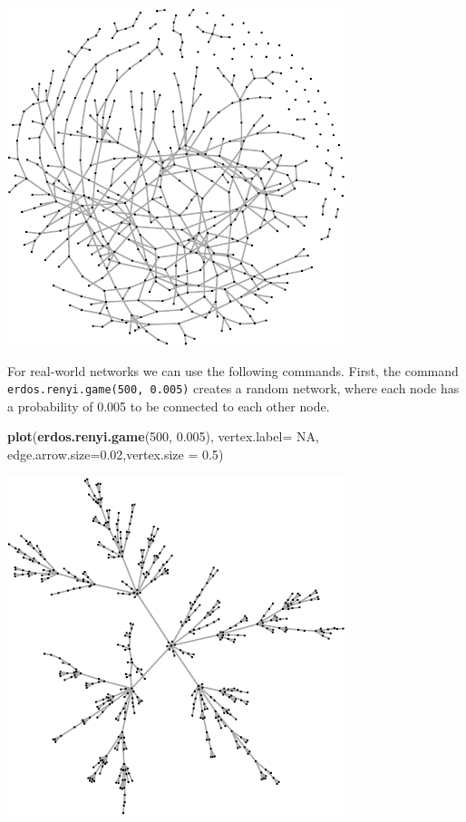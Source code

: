 \documentclass[]{article}
\newenvironment{Shaded}{\begin{snugshade}}{\end{snugshade}}
\newcommand{\KeywordTok}[1]{\textcolor[rgb]{0.13,0.29,0.53}{\textbf{{#1}}}}
\newcommand{\DataTypeTok}[1]{\textcolor[rgb]{0.13,0.29,0.53}{{#1}}}
\newcommand{\DecValTok}[1]{\textcolor[rgb]{0.00,0.00,0.81}{{#1}}}
\newcommand{\FloatTok}[1]{\textcolor[rgb]{0.00,0.00,0.81}{{#1}}}
\newcommand{\OtherTok}[1]{\textcolor[rgb]{0.56,0.35,0.01}{{#1}}}
\newcommand{\NormalTok}[1]{{#1}}
\theoremstyle{definition}
\theoremstyle{definition}
\theoremstyle{definition}
\theoremstyle{remark}
\begin{document}
\includegraphics{ResearchTools_files/figure-latex/unnamed-chunk-55-1.pdf}

For real-world networks we can use the following commands. First, the
command \texttt{erdos.renyi.game(500,\ 0.005)} creates a random network,
where each node has a probability of 0.005 to be connected to each other
node.

\begin{Shaded}
\begin{Highlighting}[]
\KeywordTok{plot}\NormalTok{(}\KeywordTok{erdos.renyi.game}\NormalTok{(}\DecValTok{500}\NormalTok{, }\FloatTok{0.005}\NormalTok{), }\DataTypeTok{vertex.label=} \OtherTok{NA}\NormalTok{, }\DataTypeTok{edge.arrow.size=}\FloatTok{0.02}\NormalTok{,}\DataTypeTok{vertex.size =} \FloatTok{0.5}\NormalTok{)}
\end{Highlighting}
\end{Shaded}

\includegraphics{ResearchTools_files/figure-latex/unnamed-chunk-56-1.pdf}
\end{document}

